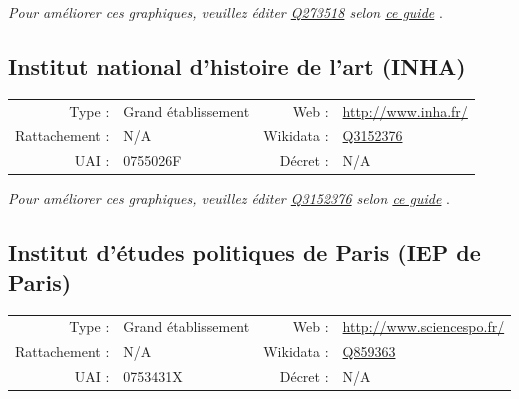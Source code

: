 \documentclass[12pt,french,landscape]{article}
\begin{document}
\textit{\scriptsize Pour améliorer ces graphiques, veuillez éditer \href{https://www.wikidata.org/entity/Q273518}{Q273518}  selon \href{https://github.com/cpesr/wikidataESR/blob/master/Rmd/wikidataESR.md}{ce guide}}
.


\newpage

\hypertarget{institut-national-dhistoire-de-lart-inha}{%
\subsection{Institut national d'histoire de l'art
(INHA)}\label{institut-national-dhistoire-de-lart-inha}}

\begin{tabular*}{0.45\textwidth}{rp{2cm}rl}  
\hline  
Type : & Grand établissement & Web : &\href{http://www.inha.fr/}{http://www.inha.fr/} \\  
Rattachement : & N/A & Wikidata : & \href{https://www.wikidata.org/entity/Q3152376}{Q3152376} \\  
UAI : & 0755026F & Décret : & N/A \\  
\hline  
\end{tabular*}

\textit{\scriptsize Pour améliorer ces graphiques, veuillez éditer \href{https://www.wikidata.org/entity/Q3152376}{Q3152376}  selon \href{https://github.com/cpesr/wikidataESR/blob/master/Rmd/wikidataESR.md}{ce guide}}
.


\newpage

\hypertarget{institut-duxe9tudes-politiques-de-paris-iep-de-paris}{%
\subsection{Institut d'études politiques de Paris (IEP de
Paris)}\label{institut-duxe9tudes-politiques-de-paris-iep-de-paris}}

\begin{tabular*}{0.45\textwidth}{rp{2cm}rl}  
\hline  
Type : & Grand établissement & Web : &\href{http://www.sciencespo.fr/}{http://www.sciencespo.fr/} \\  
Rattachement : & N/A & Wikidata : & \href{https://www.wikidata.org/entity/Q859363}{Q859363} \\  
UAI : & 0753431X & Décret : & N/A \\  
\hline  
\end{tabular*}
\end{document}
